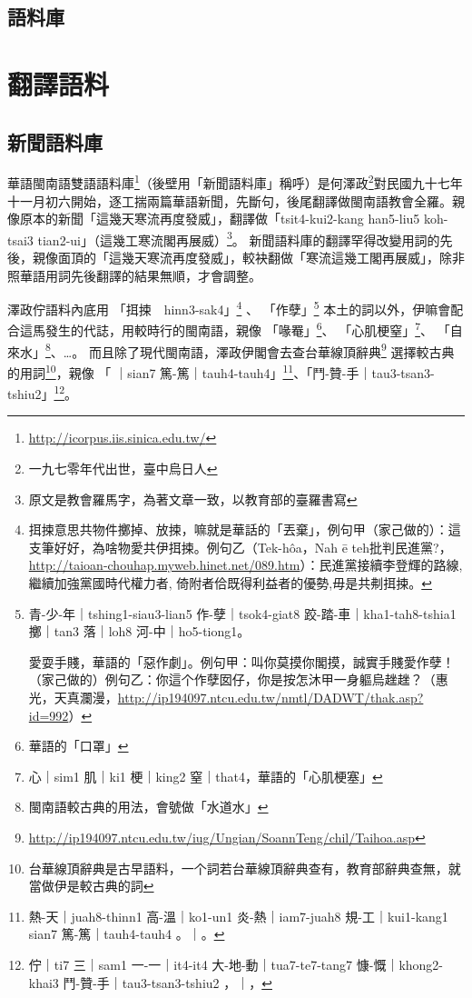 \documentclass[final,oneside,onecolumn,12pt,a4paper]{book}%
\begin{document}
\section{語料庫}
\label{節：語料庫}


\chapter{翻譯語料}
\label{章：翻譯語料}


\section{新聞語料庫}
\label{節：新聞語料庫}
華語閩南語雙語語料庫\footnote{\url{http://icorpus.iis.sinica.edu.tw/}}（後壁用「新聞語料庫」稱呼）是何澤政\footnote{一九七零年代出世，臺中烏日人}對民國九十七年十一月初六開始，逐工揣兩篇華語新聞，先斷句，後尾翻譯做閩南語教會全羅。親像原本的新聞「這幾天寒流再度發威」，翻譯做「tsit4-kui2-kang han5-liu5 koh-tsai3 tian2-ui」（這幾工寒流閣再展威）\footnote{原文是教會羅馬字，為著文章一致，以教育部的臺羅書寫}。
新聞語料庫的翻譯罕得改變用詞的先後，親像面頂的「這幾天寒流再度發威」，較袂翻做「寒流這幾工閣再展威」，除非照華語用詞先後翻譯的結果無順，才會調整。

澤政佇語料內底用
「挕捒　hinn3-sak4」\footnote{挕捒意思共物件擲掉、放捒，嘛就是華話的「丟棄」，例句甲（家己做的）：這支筆好好，為啥物愛共伊挕捒。例句乙（Tek-hôa，Nah ē teh批判民進黨?，\url{http://taioan-chouhap.myweb.hinet.net/089.htm}）：民進黨接續李登輝的路線, 繼續加強黨國時代權力者, 倚附者佮既得利益者的優勢,毋是共刜挕捒。}
、
「作孽」\footnote{
青-少-年｜tshing1-siau3-lian5 作-孽｜tsok4-giat8 跤-踏-車｜kha1-tah8-tshia1 擲｜tan3 落｜loh8 河-中｜ho5-tiong1。

愛耍手賤，華語的「惡作劇」。例句甲：叫你莫摸你閣摸，誠實手賤愛作孽！（家己做的）例句乙：你這个作孽囡仔，你是按怎沐甲一身軀烏趖趖？（惠光，天真瀾漫，\url{http://ip194097.ntcu.edu.tw/nmtl/DADWT/thak.asp?id=992}）}
本土的詞以外，伊嘛會配合這馬發生的代誌，用較時行的閩南語，親像
「喙罨」\footnote{華語的「口罩」}、
「心肌梗窒」\footnote{心｜sim1 肌｜ki1 梗｜king2 窒｜that4，華語的「心肌梗塞」}、
「自來水」\footnote{閩南語較古典的用法，會號做「水道水」}、…。
而且除了現代閩南語，澤政伊閣會去查台華線頂辭典\footnote{\url{http://ip194097.ntcu.edu.tw/iug/Ungian/SoannTeng/chil/Taihoa.asp}}
選擇較古典的用詞\footnote{台華線頂辭典是古早語料，一个詞若台華線頂辭典查有，教育部辭典查無，就當做伊是較古典的詞}，親像
「𤺪｜sian7 篤-篤｜tauh4-tauh4」\footnote{熱-天｜juah8-thinn1 高-溫｜ko1-un1 炎-熱｜iam7-juah8 規-工｜kui1-kang1 𤺪｜sian7 篤-篤｜tauh4-tauh4 。｜。}、「鬥-贊-手｜tau3-tsan3-tshiu2」\footnote{佇｜ti7 三｜sam1 一-一｜it4-it4 大-地-動｜tua7-te7-tang7 慷-慨｜khong2-khai3 鬥-贊-手｜tau3-tsan3-tshiu2 ，｜，}。
\end{document}
